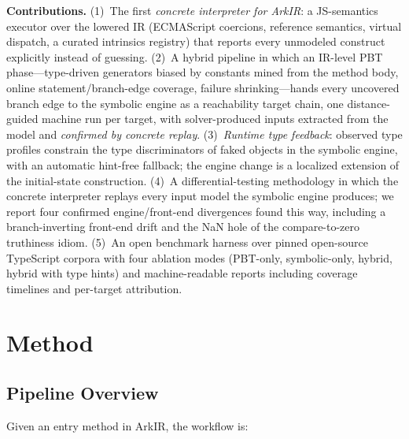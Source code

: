 \documentclass[sigconf,nonacm,screen]{acmart}
\begin{document}
\textbf{Contributions.}
(1)~The first \emph{concrete interpreter for ArkIR}: a JS-semantics
executor over the lowered IR (ECMAScript coercions, reference semantics,
virtual dispatch, a curated intrinsics registry) that reports every
unmodeled construct explicitly instead of guessing.
(2)~A hybrid pipeline in which an IR-level PBT phase---type-driven
generators biased by constants mined from the method body, online
statement/branch-edge coverage, failure shrinking---hands every uncovered
branch edge to the symbolic engine as a reachability target chain, one
distance-guided machine run per target, with solver-produced inputs
extracted from the model and \emph{confirmed by concrete replay}.
(3)~\emph{Runtime type feedback}: observed type profiles constrain the type
discriminators of faked objects in the symbolic engine, with an automatic
hint-free fallback; the engine change is
a localized extension of the initial-state construction.
(4)~A differential-testing methodology in which the concrete interpreter
replays every input model the symbolic engine produces; we report four
confirmed engine/front-end divergences found this way, including a
branch-inverting front-end drift and the NaN hole of the compare-to-zero
truthiness idiom.
(5)~An open benchmark harness over pinned open-source TypeScript corpora
with four ablation modes (PBT-only, symbolic-only, hybrid, hybrid with type
hints) and machine-readable reports including coverage timelines and
per-target attribution.

\section{Method}

\subsection{Pipeline Overview}

Given an entry method in ArkIR, the workflow is:
\end{document}

